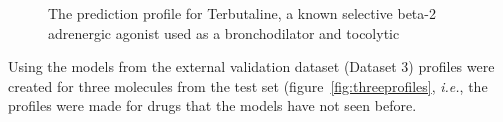 \documentclass[utf8]{frontiersSCNS} %
\begin{document}
\begin{figure}
\begin{minipage}{0.19\textwidth}
    \end{minipage}
    \caption{The prediction profile for Terbutaline, a known selective beta-2 adrenergic agonist  used as a broncho\-dilator and tocolytic \label{fig:web}}
\end{figure}
Using the models from the external validation dataset (Dataset 3) profiles were
created for three molecules from the test set (figure~\ref{fig:threeprofiles},
\textit{i.e.}, the profiles were made for drugs that the models have not seen
before.

\begin{figure}
\hfill
\begin{minipage}[t]{0.3\textwidth}

\end{minipage}
\end{figure}
\end{document}
